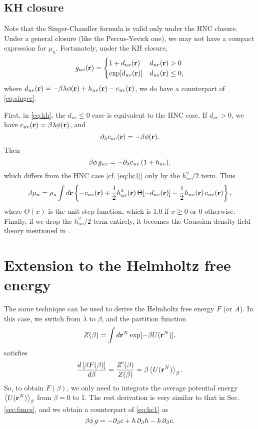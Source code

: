 \documentclass[12pt]{article}
\begin{document}
\subsection{KH closure}

Note that the Singer-Chandler formula is valid
  only under the HNC closure.
Under a general closure (like the Percus-Yevick one),
  we may not have a compact expression for $\mu_u$.
Fortunately, under the KH closure,
\begin{equation}
  g_{uv}(\mathbf{r}) =
  \begin{cases}
    1 + d_{uv}(\mathbf{r})
    & d_{uv}(\mathbf{r}) > 0
  \\
    \exp[ d_{uv}(\mathbf{r}) ]
    & d_{uv}(\mathbf{r}) \le 0,
  \end{cases}
  \label{eq:kh}
\end{equation}
where $d_{uv}(\mathbf{r}) = -\beta \lambda \phi(\mathbf{r}) + h_{uv}(\mathbf{r}) - c_{uv}(\mathbf{r})$,
we do have a counterpart of \eqref{eq:singer}.


First, in \eqref{eq:kh}, the $d_{uv} \le 0$ case is equivalent to the HNC case.
%
If $d_{uv} > 0$, we have $c_{uv}(\mathbf{r}) = \beta \lambda \phi(\mathbf{r})$, and
\[
  \partial_\lambda c_{uv}(\mathbf{r}) = -\beta \phi(\mathbf{r}).
\]
Then
\[
  \beta \phi \, g_{uv}
  = -\partial_\lambda c_{uv} \, (1 + h_{uv}),
\]
which differs from the HNC case [cf. \eqref{eq:hc1}]
  only by the $h_{uv}^2/2$ term.
Thus
%
\begin{equation}
\beta \mu_u
  =
  \rho_u \int d\mathbf{r}
  \left\{
    - c_{uv}(\mathbf{r})
    + \frac{1}{2} h_{uv}^2(\mathbf{r}) \, \Theta[ -d_{uv}(\mathbf{r}) ]
    - \frac{1}{2} h_{uv}(\mathbf{r}) \, c_{uv}(\mathbf{r})
  \right\},
  \label{eq:singer-kh}
\end{equation}
%
where $\Theta(x)$ is the unit step function,
which is 1.0 if $x \ge 0$ or 0 otherwise.
%
Finally, if we drop the $h_{uv}^2/2$ term entirely,
it becomes the Gaussian density field theory mentioned in \cite{singer}.




\section{Extension to the Helmholtz free energy}

The same technique can be used to derive the Helmholtz free energy $F$ (or $A$).
%
In this case, we switch from $\lambda$ to $\beta$,
and the partition function
%
\begin{equation}
  Z(\beta) = \int d\mathbf{r}^N \exp[-\beta U(\mathbf{r}^N)].
  \label{eq:partfunc_beta}
\end{equation}
%
satisfies
\begin{align*}
  \frac{ d \left[ \beta F(\beta) \right] }
  { d \beta }
  = \frac{ Z'(\beta) }{Z(\beta)}
  = \beta \left\langle
      U(\mathbf{r}^N)
    \right\rangle_\beta.
\end{align*}
%
So, to obtain $F(\beta)$, we only need to integrate
  the average potential energy
  $\left\langle U(\mathbf{r}^N) \right\rangle_\beta$
  from $\beta = 0$ to 1.
%
The rest derivation is very similar to that in Sec. \ref{sec:funcs},
and we obtain a counterpart of \eqref{eq:hc1} as
%
\begin{equation}
  \beta \phi \, g
  =
  - \partial_\beta c + h \, \partial_\beta h - h \, \partial_\beta c.
  \label{eq:hcall}
\end{equation}
\end{document}
